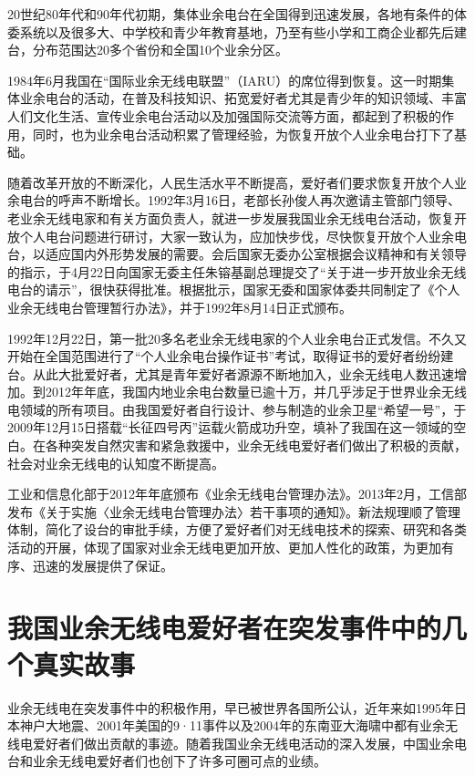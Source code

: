 \documentclass[12pt,UTF8]{ctexbook}
\begin{document}
20世纪80年代和90年代初期，集体业余电台在全国得到迅速发展，各地有条件的体委系统以及很多大、中学校和青少年教育基地，乃至有些小学和工商企业都先后建台，分布范围达20多个省份和全国10个业余分区。

1984年6月我国在“国际业余无线电联盟”（IARU）的席位得到恢复。这一时期集体业余电台的活动，在普及科技知识、拓宽爱好者尤其是青少年的知识领域、丰富人们文化生活、宣传业余电台活动以及加强国际交流等方面，都起到了积极的作用，同时，也为业余电台活动积累了管理经验，为恢复开放个人业余电台打下了基础。

随着改革开放的不断深化，人民生活水平不断提高，爱好者们要求恢复开放个人业余电台的呼声不断增长。1992年3月16日，老部长孙俊人再次邀请主管部门领导、老业余无线电家和有关方面负责人，就进一步发展我国业余无线电台活动，恢复开放个人电台问题进行研讨，大家一致认为，应加快步伐，尽快恢复开放个人业余电台，以适应国内外形势发展的需要。会后国家无委办公室根据会议精神和有关领导的指示，于4月22日向国家无委主任朱镕基副总理提交了“关于进一步开放业余无线电台的请示”，很快获得批准。根据批示，国家无委和国家体委共同制定了《个人业余无线电台管理暂行办法》，并于1992年8月14日正式颁布。

1992年12月22日，第一批20多名老业余无线电家的个人业余电台正式发信。不久又开始在全国范围进行了“个人业余电台操作证书”考试，取得证书的爱好者纷纷建台。从此大批爱好者，尤其是青年爱好者源源不断地加入，业余无线电人数迅速增加。到2012年年底，我国内地业余电台数量已逾十万，并几乎涉足于世界业余无线电领域的所有项目。由我国爱好者自行设计、参与制造的业余卫星“希望一号”，于2009年12月15日搭载“长征四号丙”运载火箭成功升空，填补了我国在这一领域的空白。在各种突发自然灾害和紧急救援中，业余无线电爱好者们做出了积极的贡献，社会对业余无线电的认知度不断提高。

工业和信息化部于2012年年底颁布《业余无线电台管理办法》。2013年2月，工信部发布《关于实施〈业余无线电台管理办法〉若干事项的通知》。新法规理顺了管理体制，简化了设台的审批手续，方便了爱好者们对无线电技术的探索、研究和各类活动的开展，体现了国家对业余无线电更加开放、更加人性化的政策，为更加有序、迅速的发展提供了保证。

\section{我国业余无线电爱好者在突发事件中的几个真实故事}

业余无线电在突发事件中的积极作用，早已被世界各国所公认，近年来如1995年日本神户大地震、2001年美国的9·11事件以及2004年的东南亚大海啸中都有业余无线电爱好者们做出贡献的事迹。随着我国业余无线电活动的深入发展，中国业余电台和业余无线电爱好者们也创下了许多可圈可点的业绩。
\end{document}
